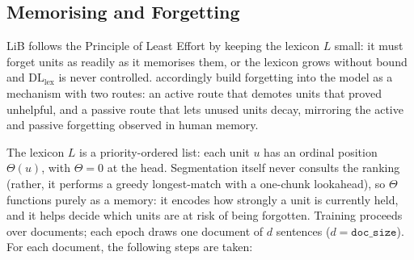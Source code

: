 \documentclass[pdflatex,sn-apa]{sn-jnl}
\begin{document}
\newcommand{\TODO}[1]{\textcolor{todocolor}{[\textbf{TODO}: #1]}}


\subsection{Memorising and Forgetting}
\label{sec:forgetting}

LiB follows the Principle of Least Effort by keeping the lexicon $L$ small: it
must forget units as readily as it memorises them, or the lexicon grows
without bound and $\mathrm{DL}_\mathrm{lex}$ is never controlled.
\citet{yang2020less} accordingly build forgetting into the model as a
mechanism with two routes: an active route that demotes
units that proved unhelpful, and a passive route that lets unused units decay,
mirroring the active and passive forgetting observed in human memory.

The lexicon $L$ is a priority-ordered list: each unit $u$ has an ordinal
position $\Theta(u)$, with $\Theta=0$ at the head. Segmentation itself never
consults the ranking (rather, it performs a greedy longest-match with a one-chunk
lookahead), so $\Theta$ functions purely as a memory: it encodes how strongly a unit is
currently held, and it helps decide which units are at risk of being forgotten.
Training proceeds over documents; each epoch draws one document of
$d$ sentences ($d=\texttt{doc\_size}$). For each document, the following steps are taken:
\end{document}
